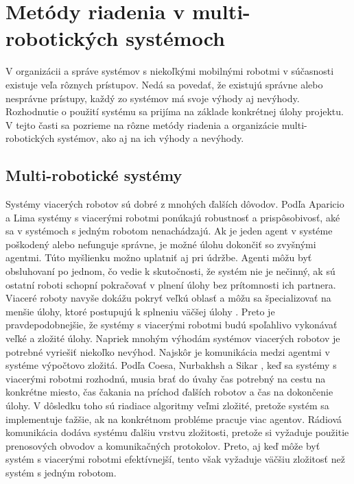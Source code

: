 \section{Metódy riadenia v multi-robotických systémoch}
V organizácii a správe systémov s niekoľkými mobilnými robotmi v súčasnosti existuje veľa rôznych prístupov. Nedá sa povedať, že existujú správne alebo nesprávne prístupy, každý zo systémov má svoje výhody aj nevýhody. Rozhodnutie o použití systému sa prijíma na základe konkrétnej úlohy projektu.
V tejto časti sa pozrieme na rôzne metódy riadenia a organizácie multi-robotických systémov, ako aj na ich výhody a nevýhody.

\subsection{Multi-robotické systémy}

Systémy viacerých robotov sú dobré z mnohých ďalších dôvodov. Podľa Aparicio a Lima \citep{aparicio} systémy s viacerými robotmi  ponúkajú robustnosť a prispôsobivosť, aké sa v systémoch s jedným robotom nenachádzajú. Ak je jeden agent v systéme poškodený alebo nefunguje správne, je možné úlohu dokončiť so zvyšnými agentmi. Túto myšlienku možno uplatniť aj pri údržbe. Agenti môžu byť obsluhovaní po jednom, čo vedie k skutočnosti, že systém nie je nečinný, ak sú ostatní roboti schopní pokračovať v plnení úlohy bez prítomnosti ich partnera. Viaceré roboty navyše dokážu pokryť veľkú oblasť a môžu sa špecializovať na menšie úlohy, ktoré postupujú k splneniu väčšej úlohy \citep{aparicio}. Preto je pravdepodobnejšie, že systémy s viacerými robotmi budú spoľahlivo vykonávať veľké a zložité úlohy. Napriek mnohým výhodám systémov viacerých robotov je potrebné vyriešiť niekoľko nevýhod. Najskôr je komunikácia medzi agentmi v systéme výpočtovo zložitá. Podľa Coesa, Nurbakhsh a Sikar %
, keď sa systémy s viacerými robotmi rozhodnú, musia brať do úvahy čas potrebný na cestu na konkrétne miesto, čas čakania na príchod ďalších robotov a čas na dokončenie úlohy. V dôsledku toho sú riadiace algoritmy veľmi zložité, pretože systém sa implementuje ťažšie, ak na konkrétnom probléme pracuje viac agentov. Rádiová komunikácia dodáva systému ďalšiu vrstvu zložitosti, pretože si vyžaduje použitie prenosových obvodov a komunikačných protokolov. Preto, aj keď môže byť systém s viacerými robotmi efektívnejší, tento však vyžaduje väčšiu zložitosť než systém s jedným robotom. 

